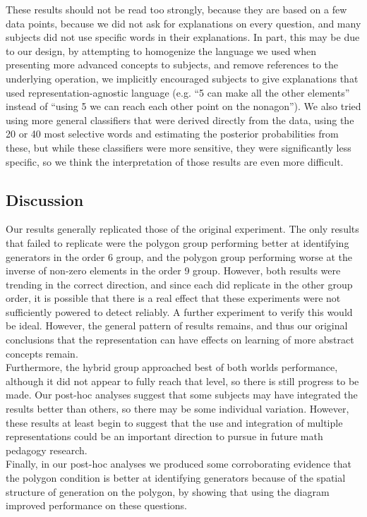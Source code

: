 \documentclass[11pt]{article}
\begin{document}
These results should not be read too strongly, because they are based on a few data points, because we did not ask for explanations on every question, and many subjects did not use specific words in their explanations. In part, this may be due to our design, by attempting to homogenize the language we used when presenting more advanced concepts to subjects, and remove references to the underlying operation, we implicitly encouraged subjects to give explanations that used representation-agnostic language (e.g. ``5 can make all the other elements'' instead of ``using 5 we can reach each other point on the nonagon''). We also tried using more general classifiers that were derived directly from the data, using the 20 or 40 most selective words and estimating the posterior probabilities from these, but while these classifiers were more sensitive, they were significantly less specific, so we think the interpretation of those results are even more difficult. 
\subsection{Discussion}
Our results generally replicated those of the original experiment. The only results that failed to replicate were the polygon group performing better at identifying generators in the order 6 group, and the polygon group performing worse at the inverse of non-zero elements in the order 9 group. However, both results were trending in the correct direction, and since each did replicate in the other group order, it is possible that there is a real effect that these experiments were not sufficiently powered to detect reliably. A further experiment to verify this would be ideal. However, the general pattern of results remains, and thus our original conclusions that the representation can have effects on learning of more abstract concepts remain. \\[11pt]
Furthermore, the hybrid group approached best of both worlds performance, although it did not appear to fully reach that level, so there is still progress to be made. Our post-hoc analyses suggest that some subjects may have integrated the results better than others, so there may be some individual variation. However, these results at least begin to suggest that the use and integration of multiple representations could be an important direction to pursue in future math pedagogy research. \\[11pt]
Finally, in our post-hoc analyses we produced some corroborating evidence that the polygon condition is better at identifying generators because of the spatial structure of generation on the polygon, by showing that using the diagram improved performance on these questions. 
\end{document}
